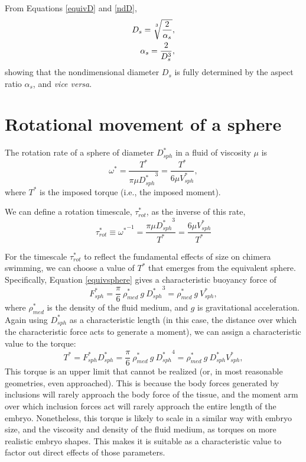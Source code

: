 \documentclass[10pt,a4paper]{article}
\def\non{\nonumber}
\begin{document}
From Equations \ref{equivD} and \ref{ndD},
\begin{eqnarray}\label{equivD2}
	D_s = \sqrt[\uproot{5}3]{\frac{2}{\alpha_s}}, \non \\
	\alpha_s = \frac{2}{D_s^3},
\end{eqnarray}
showing that the nondimensional diameter $D_s$ is fully determined by the aspect ratio $\alpha_s$, and \textit{vice versa}.


\section{Rotational movement of a sphere}\label{RotSect}
The rotation rate of a sphere of diameter $D_{sph}^*$ in a fluid of viscosity $\mu$ is 
\begin{equation}\label{rot1}
	\omega^* = \frac{T^*}{\pi \mu {D_{sph}^*}^3} = \frac{T^*}{6 \mu V_{sph}^*},	
\end{equation}
where $T^*$ is the imposed torque (i.e., the imposed moment).

We can define a rotation timescale, $\tau_{rot}^*$, as the inverse of this rate,
\begin{equation}\label{tau1}
	\tau_{rot}^* \equiv {\omega^*}^{-1} = \frac{\pi \mu {D_{sph}^*}^3}{T^*} = \frac{6 \mu V_{sph}^*}{T^*}
\end{equation}

For the timescale $\tau_{rot}^*$ to reflect the fundamental effects of size on chimera swimming, we can choose a value of $T^*$ that emerges from the equivalent sphere.
Specifically, Equation \ref{equivsphere} gives a characteristic buoyancy force of
\begin{equation}\label{charF}
	F_{sph}^* = \frac{\pi}{6} ~ \rho_{med}^* ~ g ~ {D_{sph}^*}^3 = \rho_{med}^* ~ g ~ V_{sph}^*,
\end{equation} 
where $\rho_{med}^*$ is the density of the fluid medium, and $g$ is gravitational acceleration.
Again using $D_{sph}^*$ as a characteristic length (in this case, the distance over which the characteristic force acts to generate a moment), we can assign a characteristic value to the torque:
\begin{equation}\label{charT}
	T^* = F_{sph}^* D_{sph}^* = \frac{\pi}{6} ~ \rho_{med}^* ~ g ~ {D_{sph}^*}^4 = \rho_{med}^* ~ g ~ D_{sph}^* V_{sph}^*,
\end{equation} 
This torque is an upper limit that cannot be realized (or, in most reasonable geometries, even approached).
This is because the body forces generated by inclusions will rarely approach the body force of the tissue, and the moment arm over which inclusion forces act will rarely approach the entire length of the embryo. 
Nonetheless, this torque is likely to scale in a similar way with embryo size, and the viscosity and density of the fluid medium, as torques on more realistic embryo shapes. This makes it is suitable as a characteristic value to factor out direct effects of those parameters.
\end{document}
